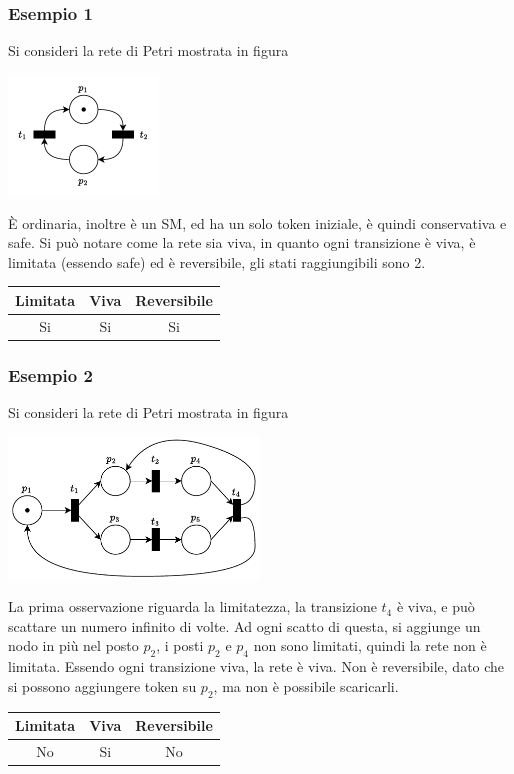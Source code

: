 \documentclass[10pt, letterpaper]{report}
\begin{document}
\subsubsection{Esempio 1}
Si consideri la rete di Petri mostrata in figura
\begin{center}
    \includegraphics[width=0.3\textwidth]{images/PetriEs1.drawio.pdf}
\end{center}
È ordinaria, inoltre è un SM, ed ha un solo token iniziale, è quindi conservativa e safe. Si può notare come la rete sia viva, in quanto ogni transizione è viva, è limitata (essendo safe) ed è reversibile, gli stati raggiungibili sono 2. \begin{center}
    \begin{tabular}{|c|c|c|}
        \hline
        \rowcolor[HTML]{EFEFEF} 
        Limitata & Viva & Reversibile \\ \hline
        Si       & Si   & Si          \\ \hline
        \end{tabular}
\end{center}
\subsubsection{Esempio 2}
Si consideri la rete di Petri mostrata in figura
\begin{center}
    \includegraphics[width=0.5\textwidth]{images/PetriEs2.drawio.pdf}
\end{center}
La prima osservazione riguarda la limitatezza, la transizione $t_4$ è viva, e può scattare un numero infinito di volte. Ad ogni scatto di questa, si aggiunge un nodo in più nel posto $p_2$, i posti $p_2$ e $p_4$ non sono limitati, quindi la rete non è limitata. \acc Essendo ogni transizione viva, la rete è viva. Non è reversibile, dato che si possono aggiungere token su $p_2$, ma non è possibile scaricarli.
\begin{center}
    \begin{tabular}{|c|c|c|}
        \hline
        \rowcolor[HTML]{EFEFEF} 
        Limitata & Viva & Reversibile \\ \hline
        No       & Si   & No          \\ \hline
        \end{tabular}
\end{center}
\end{document}
